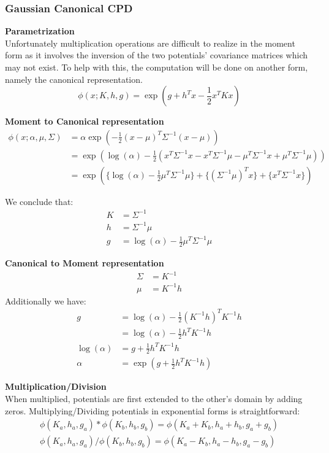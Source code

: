 \documentclass[11pt]{article}
\newcommand{\subsubsubsection}[1]{\noindent\textbf{#1}\\}
\begin{document}
\subsubsection{Gaussian Canonical CPD}
\subsubsubsection{Parametrization}
Unfortunately multiplication operations are difficult to realize in the moment form as it involves the inversion of the two potentials' covariance matrices which may not exist. To help with this, the computation will be done on another form, namely the canonical representation.
$$
\phi(x; K, h, g) = \exp(g+h^Tx - \frac{1}{2}x^TKx)
$$

\subsubsubsection{Moment to Canonical representation}
\begin{align*}
\phi(x; \alpha, \mu, \Sigma) &= \alpha \exp ( -\frac{1}{2} (x-\mu)^T\Sigma^{-1}(x-\mu)) \\
&= \exp ( \log (\alpha) - \frac{1}{2}(x^T\Sigma^{-1}x
                                     -x^T\Sigma^{-1}\mu
                                     -\mu^T\Sigma^{-1}x
                                     +\mu^T\Sigma^{-1}\mu
                                      ))\\
&= \exp ( \{\log (\alpha) - \frac{1}{2}\mu^T\Sigma^{-1}\mu\} + \{(\Sigma^{-1}\mu)^T x\} + \{x^T\Sigma^{-1}x\} )
\end{align*}

We conclude that:
\begin{align}
K &= \Sigma^{-1}\\
h &=\Sigma^{-1}\mu\\
g &= \log (\alpha) - \frac{1}{2}\mu^T\Sigma^{-1}\mu
\end{align}

\subsubsubsection{Canonical to Moment representation}
\begin{align}
\Sigma &= K^{-1}\\
\mu &=K^{-1}h \label{meanhCanonical}
\end{align}
Additionally we have:
\begin{align}
g&= \log (\alpha) - \frac{1}{2}(K^{-1}h)^TK^{-1}h \nonumber\\
&= \log (\alpha) - \frac{1}{2}h^TK^{-1}h \nonumber\\
\log (\alpha) &= g + \frac{1}{2}h^TK^{-1}h \nonumber\\
\alpha &= \exp(g + \frac{1}{2}h^TK^{-1}h )
\end{align}

\subsubsubsection{Multiplication/Division}
When multiplied, potentials are first extended to the other's domain by adding zeros. Multiplying/Dividing potentials in exponential forms is straightforward:
\begin{align}
\phi(K_a, h_a, g_a)*\phi(K_b, h_b, g_b) = \phi(K_a + K_b, h_a + h_b, g_a + g_b)\\
\phi(K_a, h_a, g_a)/\phi(K_b, h_b, g_b) = \phi(K_a - K_b, h_a - h_b, g_a - g_b)
\end{align}
\end{document}
